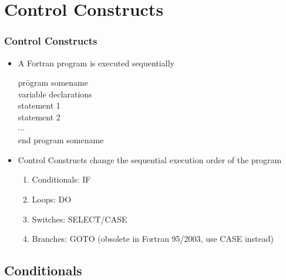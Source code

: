 \documentclass[slidestop,mathserif,compress,xcolor=svgnames]{beamer}
\begin{document}
\section{Control Constructs}
\begin{frame}
  \frametitle{\small Control Constructs}
  \begin{block}{}
    \begin{itemize}
      \item A Fortran program is executed sequentially
      \begin{tabbing}
        pr\=ogram somename \\
        \> variable declarations \\
        \> statement 1 \\
        \> statement 2 \\
        \> $\cdots$ \\
        end program somename
      \end{tabbing}
      \item Control Constructs change the sequential execution order of the program
      \begin{enumerate} \itemsep1pt \parskip0pt 
        \item Conditionals: IF
        \item Loops: DO
        \item Switches: SELECT/CASE
        \item Branches: GOTO (obsolete in Fortran 95/2003, use CASE instead)
      \end{enumerate}
    \end{itemize}
  \end{block}
\end{frame}

\subsection{Conditionals}
\end{document}
